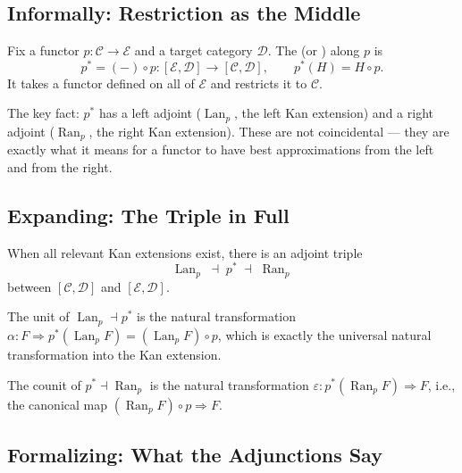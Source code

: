 \subsection{Informally: Restriction as the Middle}

Fix a functor $p : \mathcal{C} \to \mathcal{E}$ and a target category
$\mathcal{D}$. The  (or )
along $p$ is
\begin{equation*}
  p^* = (-) \circ p : [\mathcal{E}, \mathcal{D}] \to [\mathcal{C}, \mathcal{D}],
  \qquad
  p^*(H) = H \circ p.
\end{equation*}
It takes a functor defined on all of $\mathcal{E}$ and restricts it to
$\mathcal{C}$.

The key fact: $p^*$ has a left adjoint ($\operatorname{Lan}_p$, the left Kan
extension) and a right adjoint ($\operatorname{Ran}_p$, the right Kan extension).
These are not coincidental --- they are exactly what it means for a functor to
have best approximations from the left and from the right.

\subsection{Expanding: The Triple in Full}

\begin{theorem}
\label{thm:kan-adjoint-triple}
When all relevant Kan extensions exist, there is an adjoint triple
\begin{equation*}
  \operatorname{Lan}_p \;\dashv\; p^* \;\dashv\; \operatorname{Ran}_p
\end{equation*}
between $[\mathcal{C}, \mathcal{D}]$ and $[\mathcal{E}, \mathcal{D}]$.
\end{theorem}

The unit of $\operatorname{Lan}_p \dashv p^*$ is the natural transformation
$\alpha : F \Rightarrow p^*(\operatorname{Lan}_p F) = (\operatorname{Lan}_p F) \circ p$,
which is exactly the universal natural transformation into the Kan extension.

The counit of $p^* \dashv \operatorname{Ran}_p$ is the natural transformation
$\varepsilon : p^*(\operatorname{Ran}_p F) \Rightarrow F$, i.e., the canonical
map $(\operatorname{Ran}_p F) \circ p \Rightarrow F$.

\subsection{Formalizing: What the Adjunctions Say}

